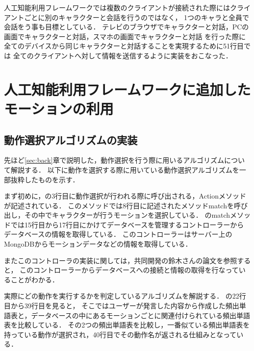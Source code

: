 人工知能利用フレームワークでは複数のクライアントが接続された際にはクライアントごとに別のキャラクターと会話を行うのではなく，
1つのキャラと全員で会話をう事も目標としている．
テレビのブラウザでキャラクターと対話，PCの画面でキャラクターと対話，スマホの画面でキャラクターと対話
を行った際に全てのデバイスから同じキャラクターと対話することを実現するために51行目では
全てのクライアントへ対して情報を送信するように実装をおこなった．


\section{人工知能利用フレームワークに追加したモーションの利用}\label{sec:motion}
\subsection{動作選択アルゴリズムの実装}
先ほど\ref{sec:back}章で説明した，動作選択を行う際に用いるアルゴリズムについて解説する．
以下に動作を選択する際に用いている動作選択アルゴリズムを一部抜粋したものを示す．


まず初めに，の3行目に動作選択が行われる際に呼び出される，Actionメソッドが記述されている．
このメソッドでは8行目に記述されたメソッドmatchを呼び出し，その中でキャラクターが行うモーションを選択している．
のmatchメソッドでは15行目から17行目にかけてデータベースを管理するコントローラーから
データベースの情報を取得している．
このコントローラーはサーバー上のMongoDBからモーションデータなどの情報を取得している．

またこのコントローラの実装に関しては，共同開発の鈴木さんの論文\cite{suzuki}を参照すると，
このコントローラーからデータベースへの接続と情報の取得を行なっていることがわかる．

実際にどの動作を実行するかを判定しているアルゴリズムを解説する．
の22行目から39行目を見ると，
そこではユーザーが発言した内容から作成した頻出単語表と，データベースの中にあるモーションごとに関連付けられている頻出単語表を比較している．
その2つの頻出単語表を比較し，一番似ている頻出単語表を持っている動作が選択され，40行目でその動作名が返される仕組みとなっている．

